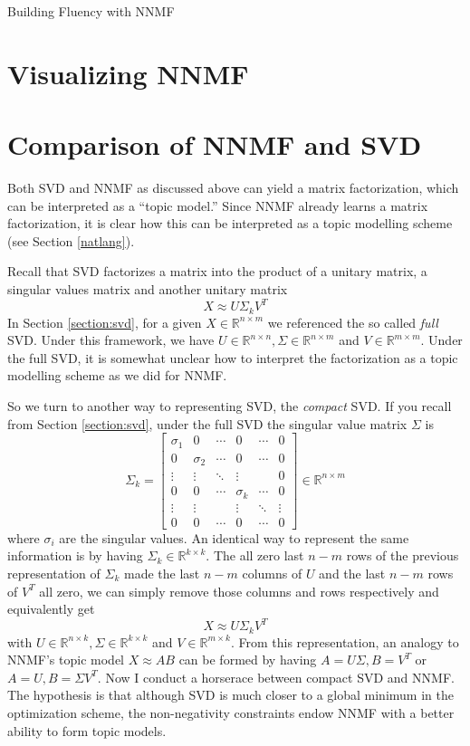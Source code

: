 \documentclass[12pt]{pom_thesis}
\begin{document}
\begin{chapter}{Building Fluency with NNMF}
	\label{basic}
	\section{Visualizing NNMF}
	\section{Comparison of NNMF and SVD}
	Both SVD and NNMF as discussed above can yield a matrix factorization, which can be interpreted as a ``topic model.'' Since NNMF already learns a matrix factorization, it is clear how this can be interpreted as a topic modelling scheme (see Section \ref{natlang}). 
	
	Recall that SVD factorizes a matrix into the product of a unitary matrix, a singular values matrix and another unitary matrix
	$$X \approx U \Sigma_k V^T$$
	In Section \ref{section:svd}, for a given $X \in \mathbb{R}^{n \times m}$ we referenced the so called \textit{full} SVD. Under this framework, we have $U \in \mathbb{R}^{n \times n}, \Sigma  \in \mathbb{R}^{n \times m}$ and $V \in \mathbb{R}^{m \times m}$. Under the full SVD, it is somewhat unclear how to interpret the factorization as a topic modelling scheme as we did for NNMF. 
	
	So we turn to another way to representing SVD, the \textit{compact} SVD. If you recall from Section \ref{section:svd}, under the full SVD the singular value matrix $\Sigma$ is 
$$\Sigma_k = \begin{bmatrix}
\sigma_1  & 0     & \cdots      &0       &   \cdots & 0   \\
0  & \sigma_2 & \cdots & 0    &  \cdots & 0    \\
\vdots  & \vdots & \ddots & \vdots &  & 0   \\
0 & 0 & \cdots & \sigma_k  & \cdots & 0  \\
\vdots  &     \vdots    && \vdots & \ddots & \vdots  \\
0 & 0      &      \cdots  &0      & \cdots & 0 
\end{bmatrix} \in \mathbb{R}^{n \times m}$$
	where $\sigma_i$ are the singular values. An identical way to represent the same information is by having $\Sigma_k \in\mathbb{R}^{k \times k }$.  The all zero last $n-m$ rows of the previous representation of $\Sigma_k$ made the last $n-m$ columns of $U$ and the last $n-m$ rows of $V^T$ all zero, we can simply remove those columns and rows respectively and equivalently get  
		$$X \approx U \Sigma_k V^T$$
		with  $U \in \mathbb{R}^{n \times k}, \Sigma  \in \mathbb{R}^{k \times k}$ and $V \in \mathbb{R}^{m \times k}$. From this representation, an analogy to NNMF's topic model $X \approx AB$ can be formed by having $A = U\Sigma, B = V^T$ or $A = U, B=\Sigma V^T$. Now I conduct a horserace between compact SVD and NNMF. The hypothesis is that although SVD is much closer to a global minimum in the optimization scheme, the non-negativity constraints endow NNMF with a better ability to form topic models.

\end{chapter}
\end{document}
